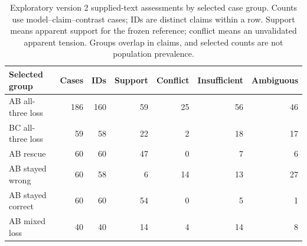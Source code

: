 \begin{table}[htbp]\centering\small
\caption{Exploratory version 2 supplied-text assessments by selected case group. Counts use model--claim--contrast cases; IDs are distinct claims within a row. Support means apparent support for the frozen reference; conflict means an unvalidated apparent tension. Groups overlap in claims, and selected counts are not population prevalence.}\label{tab:alignment}
\begin{tabularx}{\linewidth}{Xrrrrrr}\toprule
Selected group & Cases & IDs & Support & Conflict & Insufficient & Ambiguous \\\midrule
AB all-three loss & 186 & 160 & 59 & 25 & 56 & 46 \\
BC all-three loss & 59 & 58 & 22 & 2 & 18 & 17 \\
AB rescue & 60 & 60 & 47 & 0 & 7 & 6 \\
AB stayed wrong & 60 & 58 & 6 & 14 & 13 & 27 \\
AB stayed correct & 60 & 60 & 54 & 0 & 5 & 1 \\
AB mixed loss & 40 & 40 & 14 & 4 & 14 & 8 \\
\bottomrule
\end{tabularx}
\end{table}